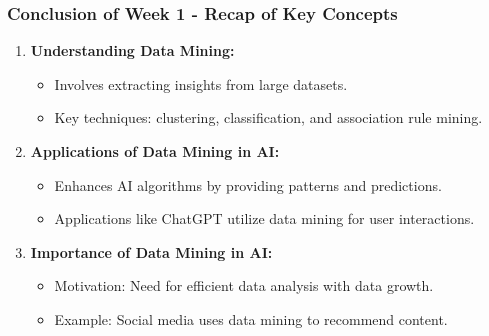 \documentclass[aspectratio=169]{beamer}
\begin{document}
\begin{frame}[fragile]
  \frametitle{Conclusion of Week 1 - Recap of Key Concepts}
  
  \begin{enumerate}
    \item \textbf{Understanding Data Mining:}
    \begin{itemize}
      \item Involves extracting insights from large datasets.
      \item Key techniques: clustering, classification, and association rule mining.
    \end{itemize}

    \item \textbf{Applications of Data Mining in AI:}
    \begin{itemize}
      \item Enhances AI algorithms by providing patterns and predictions.
      \item Applications like ChatGPT utilize data mining for user interactions.
    \end{itemize}

    \item \textbf{Importance of Data Mining in AI:}
    \begin{itemize}
      \item Motivation: Need for efficient data analysis with data growth.
      \item Example: Social media uses data mining to recommend content.
    \end{itemize}
  \end{enumerate}
\end{frame}
\end{document}
